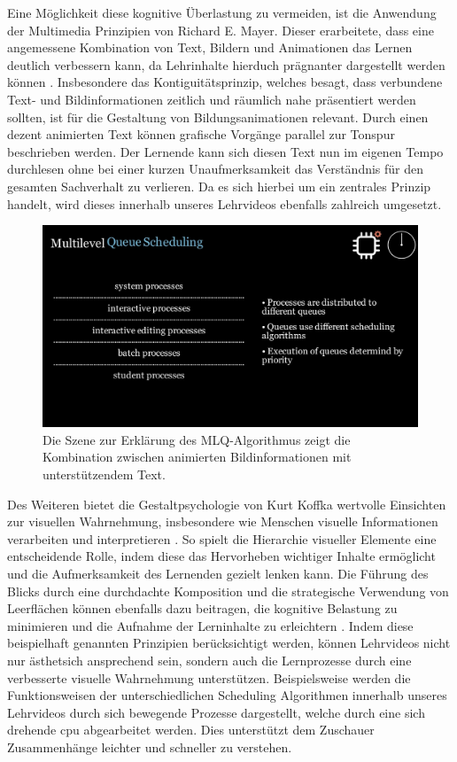 Eine Möglichkeit diese kognitive Überlastung zu vermeiden, ist die Anwendung der Multimedia Prinzipien von Richard E. Mayer. Dieser erarbeitete, dass eine angemessene Kombination von Text, Bildern und Animationen das Lernen deutlich verbessern kann, da Lehrinhalte hierduch prägnanter dargestellt werden können \autocite{mayer_multimedia_2002}. Insbesondere das Kontiguitätsprinzip, welches besagt, dass verbundene Text- und Bildinformationen zeitlich und räumlich nahe präsentiert werden sollten, ist für die Gestaltung von Bildungsanimationen relevant. Durch einen dezent animierten Text können grafische Vorgänge parallel zur Tonspur beschrieben werden. Der Lernende kann sich diesen Text nun im eigenen Tempo durchlesen ohne bei einer kurzen Unaufmerksamkeit das Verständnis für den gesamten Sachverhalt zu verlieren. Da es sich hierbei um ein zentrales Prinzip handelt, wird dieses innerhalb unseres Lehrvideos ebenfalls zahlreich umgesetzt. 

\begin{figure}[h]
	\centering
	\includegraphics[width=0.8\linewidth]{img/screen_text.png} 
	\caption{Die Szene zur Erklärung des \ac{MLQ}-Algorithmus zeigt die Kombination zwischen animierten Bildinformationen mit unterstützendem Text.}
	\label{fig:screen_text} 
\end{figure}

Des Weiteren bietet die Gestaltpsychologie von Kurt Koffka wertvolle Einsichten zur visuellen Wahrnehmung, insbesondere wie Menschen visuelle Informationen verarbeiten und interpretieren \autocite{koffka_principles_1999}. So spielt die Hierarchie visueller Elemente eine entscheidende Rolle, indem diese das Hervorheben wichtiger Inhalte ermöglicht und die Aufmerksamkeit des Lernenden gezielt lenken kann. Die Führung des Blicks durch eine durchdachte Komposition und die strategische Verwendung von Leerflächen können ebenfalls dazu beitragen, die kognitive Belastung zu minimieren und die Aufnahme der Lerninhalte zu erleichtern \autocite{koffka_principles_1999}.
Indem diese beispielhaft genannten Prinzipien berücksichtigt werden, können Lehrvideos nicht nur ästhetsich ansprechend sein, sondern auch die Lernprozesse durch eine verbesserte visuelle Wahrnehmung unterstützen. Beispielsweise werden die Funktionsweisen der unterschiedlichen Scheduling Algorithmen innerhalb unseres Lehrvideos durch sich bewegende Prozesse dargestellt, welche durch eine sich drehende \ac{cpu} abgearbeitet werden. Dies unterstützt dem Zuschauer Zusammenhänge leichter und schneller zu verstehen. 

